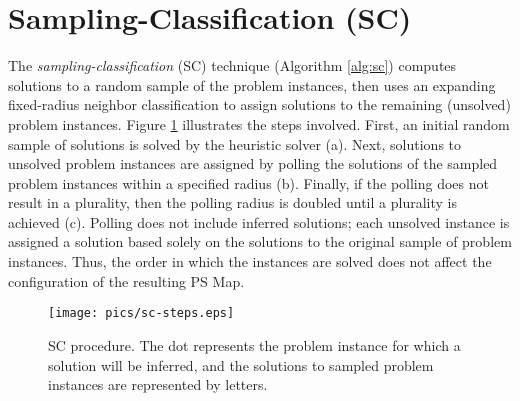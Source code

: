 \section{Sampling-Classification (SC)}
The \textit{sampling-classification} (SC) technique (Algorithm \ref{alg:sc}) computes solutions to a random sample of the problem instances, then uses an expanding fixed-radius neighbor classification to assign solutions to the remaining (unsolved) problem instances.  Figure \ref{fig:sc-steps} illustrates the steps involved.  First, an initial random sample of solutions is solved by the heuristic solver (a).  Next, solutions to unsolved problem instances are assigned by polling the solutions of the sampled problem instances within a specified radius (b).  Finally, if the polling does not result in a plurality, then the polling radius is doubled until a plurality is achieved (c).  Polling does not include inferred solutions; each unsolved instance is assigned a solution based solely on the solutions to the original sample of problem instances.  Thus, the order in which the instances are solved does not affect the configuration of the resulting PS Map.


\begin{figure}
\begin{center}
    \texttt{[image: pics/sc-steps.eps]}
    \caption{SC procedure.  The dot represents the problem instance for which a solution will be inferred, and the solutions to sampled problem instances are represented by letters.}
    \label{fig:sc-steps}
\end{center}
\end{figure}




